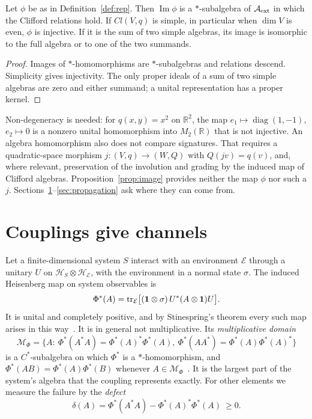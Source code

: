 \begin{proposition}
\label{prop:image}
Let $\phi$ be as in Definition~\ref{def:rep}. Then $\operatorname{Im}\phi$ is a $*$-subalgebra of $\mathcal A_{\rm ext}$ in which the Clifford relations hold. If $Cl(V,q)$ is simple, in particular when $\dim V$ is even, $\phi$ is injective. If it is the sum of two simple algebras, its image is isomorphic to the full algebra or to one of the two summands.
\end{proposition}

\begin{proof}
Images of $*$-homomorphisms are $*$-subalgebras and relations descend. Simplicity gives injectivity. The only proper ideals of a sum of two simple algebras are zero and either summand; a unital representation has a proper kernel.
\end{proof}

Non-degeneracy is needed: for $q(x,y)=x^2$ on $\mathbb R^2$, the map $e_1\mapsto\operatorname{diag}(1,-1)$, $e_2\mapsto0$ is a nonzero unital homomorphism into $M_2(\mathbb R)$ that is not injective. An algebra homomorphism also does not compare signatures. That requires a quadratic-space morphism $j:(V,q)\to(W,Q)$ with $Q(jv)=q(v)$, and, where relevant, preservation of the involution and grading by the induced map of Clifford algebras. Proposition~\ref{prop:image} provides neither the map $\phi$ nor such a $j$. Sections~\ref{sec:channels}--\ref{sec:propagation} ask where they can come from.

\section{Couplings give channels}
\label{sec:channels}

Let a finite-dimensional system $S$ interact with an environment $\mathcal E$ through a unitary $U$ on $\mathcal H_S\otimes\mathcal H_{\mathcal E}$, with the environment in a normal state $\sigma$. The induced Heisenberg map on system observables is
\begin{equation}
\Phi^*(A)=\operatorname{tr}_{\mathcal E}\bigl[(\mathbf 1\otimes\sigma)\,U^*(A\otimes\mathbf 1)U\bigr].
\label{eq:heis}
\end{equation}
It is unital and completely positive, and by Stinespring's theorem every such map arises in this way~\cite{Stinespring1955}. It is in general not multiplicative. Its \emph{multiplicative domain}
\begin{equation}
\mathcal M_\Phi=\{A:\ \Phi^*(A^*A)=\Phi^*(A)^*\Phi^*(A),\ \Phi^*(AA^*)=\Phi^*(A)\Phi^*(A)^*\}
\end{equation}
is a $C^*$-subalgebra on which $\Phi^*$ is a $*$-homomorphism, and $\Phi^*(AB)=\Phi^*(A)\Phi^*(B)$ whenever $A\in\mathcal M_\Phi$~\cite{Choi1974,Paulsen2002}. It is the largest part of the system's algebra that the coupling represents exactly. For other elements we measure the failure by the \emph{defect}
\begin{equation}
\delta(A)=\Phi^*(A^*A)-\Phi^*(A)^*\Phi^*(A)\ \ge0 .
\label{eq:defect}
\end{equation}

